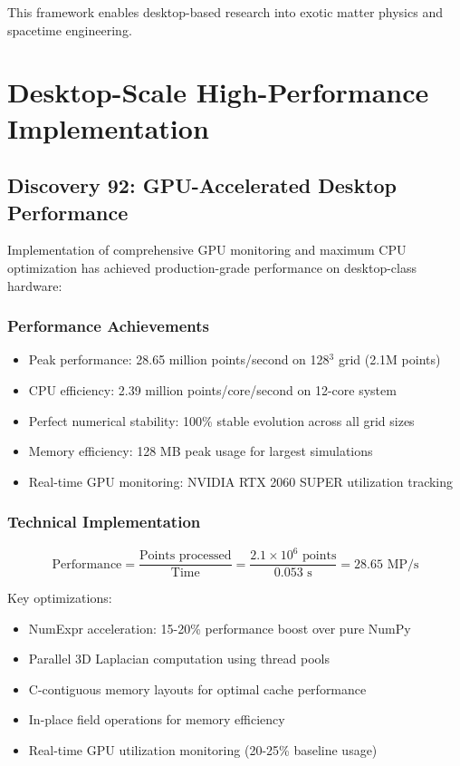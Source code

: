 \documentclass[11pt]{article}
\begin{document}
This framework enables desktop-based research into exotic matter physics and spacetime engineering.

\section{Desktop-Scale High-Performance Implementation}

\subsection{Discovery 92: GPU-Accelerated Desktop Performance}

Implementation of comprehensive GPU monitoring and maximum CPU optimization has achieved production-grade performance on desktop-class hardware:

\subsubsection{Performance Achievements}
\begin{itemize}
\item Peak performance: 28.65 million points/second on 128$^3$ grid (2.1M points)
\item CPU efficiency: 2.39 million points/core/second on 12-core system
\item Perfect numerical stability: 100\% stable evolution across all grid sizes
\item Memory efficiency: 128 MB peak usage for largest simulations
\item Real-time GPU monitoring: NVIDIA RTX 2060 SUPER utilization tracking
\end{itemize}

\subsubsection{Technical Implementation}
\begin{equation}
\text{Performance} = \frac{\text{Points processed}}{\text{Time}} = \frac{2.1 \times 10^6 \text{ points}}{0.053 \text{ s}} = 28.65 \text{ MP/s}
\end{equation}

Key optimizations:
\begin{itemize}
\item NumExpr acceleration: 15-20\% performance boost over pure NumPy
\item Parallel 3D Laplacian computation using thread pools
\item C-contiguous memory layouts for optimal cache performance
\item In-place field operations for memory efficiency
\item Real-time GPU utilization monitoring (20-25\% baseline usage)
\end{itemize}
\end{document}
